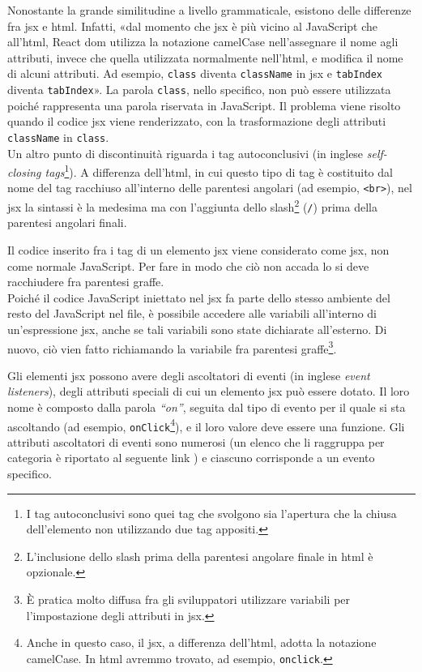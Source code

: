 Nonostante la grande similitudine a livello grammaticale, esistono delle differenze fra \acrshort{jsx} e \gls{html}. Infatti, «dal momento che \acrshort{jsx} è più vicino al JavaScript che all’\gls{html}, React \gls{dom} utilizza la notazione camelCase nell’assegnare il nome agli attributi, invece che quella utilizzata normalmente nell’\gls{html}, e modifica il nome di alcuni attributi. Ad esempio, \texttt{class} diventa \texttt{className} in \acrshort{jsx} e \texttt{tabIndex} diventa \texttt{tabIndex}»\cite{React_IntroduzioneJSX}. La parola \texttt{class}, nello specifico, non può essere utilizzata poiché rappresenta una parola riservata in JavaScript. Il problema viene risolto quando il codice \acrshort{jsx} viene renderizzato, con la trasformazione degli attributi \texttt{className} in \texttt{class}.\\
Un altro punto di discontinuità riguarda i tag autoconclusivi (in inglese \textit{self-closing tags}\footnote{I tag autoconclusivi sono quei tag che svolgono sia l'apertura che la chiusa dell'elemento non utilizzando due tag appositi.}). A differenza dell'\gls{html}, in cui questo tipo di tag è costituito dal nome del tag racchiuso all'interno delle parentesi angolari (ad esempio, \texttt{<br>}), nel \acrshort{jsx} la sintassi è la medesima ma con l'aggiunta dello slash\footnote{L'inclusione dello slash prima della parentesi angolare finale in \gls{html} è opzionale.} (\texttt{/}) prima della parentesi angolari finali.

Il codice inserito fra i tag di un elemento \acrshort{jsx} viene considerato come \acrshort{jsx}, non come normale JavaScript. Per fare in modo che ciò non accada lo si deve racchiudere fra parentesi graffe.\\
Poiché il codice JavaScript iniettato nel \acrshort{jsx} fa parte dello stesso ambiente del resto del JavaScript nel file, è possibile accedere alle variabili all'interno di un'espressione \acrshort{jsx}, anche se tali variabili sono state dichiarate all'esterno. Di nuovo, ciò vien fatto richiamando la variabile fra parentesi graffe\footnote{È pratica molto diffusa fra gli sviluppatori utilizzare variabili per l'impostazione degli attributi in \acrshort{jsx}.}.

Gli elementi \acrshort{jsx} possono avere degli ascoltatori di eventi (in inglese \textit{event listeners}), degli attributi speciali di cui un elemento \acrshort{jsx} può essere dotato. Il loro nome è composto dalla parola \textit{“on”}, seguita dal tipo di evento per il quale si sta ascoltando (ad esempio, \texttt{onClick}\footnote{Anche in questo caso, il \acrshort{jsx}, a differenza dell'\gls{html}, adotta la notazione camelCase. In \gls{html} avremmo trovato, ad esempio, \texttt{onclick}.}), e il loro valore deve essere una funzione. Gli attributi ascoltatori di eventi sono numerosi (un elenco che li raggruppa per categoria è riportato al seguente link \cite{React_SyntheticEvent}) e ciascuno corrisponde a un evento specifico. 

